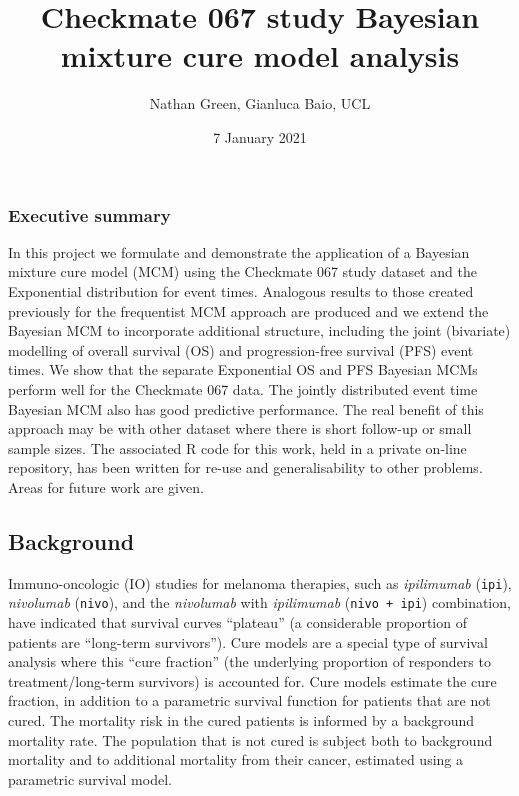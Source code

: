 \documentclass[
]{article}
\title{Checkmate 067 study Bayesian mixture cure model analysis}
\author{Nathan Green, Gianluca Baio, UCL}
\date{7 January 2021}
\begin{document}
\maketitle

\hypertarget{executive-summary}{%
\subsubsection{Executive summary}\label{executive-summary}}

In this project we formulate and demonstrate the application of a
Bayesian mixture cure model (MCM) using the Checkmate 067 study dataset
and the Exponential distribution for event times. Analogous results to
those created previously for the frequentist MCM approach are produced
and we extend the Bayesian MCM to incorporate additional structure,
including the joint (bivariate) modelling of overall survival (OS) and
progression-free survival (PFS) event times. We show that the separate
Exponential OS and PFS Bayesian MCMs perform well for the Checkmate 067
data. The jointly distributed event time Bayesian MCM also has good
predictive performance. The real benefit of this approach may be with
other dataset where there is short follow-up or small sample sizes. The
associated R code for this work, held in a private on-line repository,
has been written for re-use and generalisability to other problems.
Areas for future work are given.

\hypertarget{background}{%
\subsection{Background}\label{background}}

Immuno-oncologic (IO) studies for melanoma therapies, such as
\emph{ipilimumab} (\texttt{ipi}), \emph{nivolumab} (\texttt{nivo}), and
the \emph{nivolumab} with \emph{ipilimumab} (\texttt{nivo\ +\ ipi})
combination, have indicated that survival curves ``plateau'' (a
considerable proportion of patients are ``long-term survivors''). Cure
models are a special type of survival analysis where this ``cure
fraction'' (the underlying proportion of responders to
treatment/long-term survivors) is accounted for. Cure models estimate
the cure fraction, in addition to a parametric survival function for
patients that are not cured. The mortality risk in the cured patients is
informed by a background mortality rate. The population that is not
cured is subject both to background mortality and to additional
mortality from their cancer, estimated using a parametric survival
model.
\end{document}
